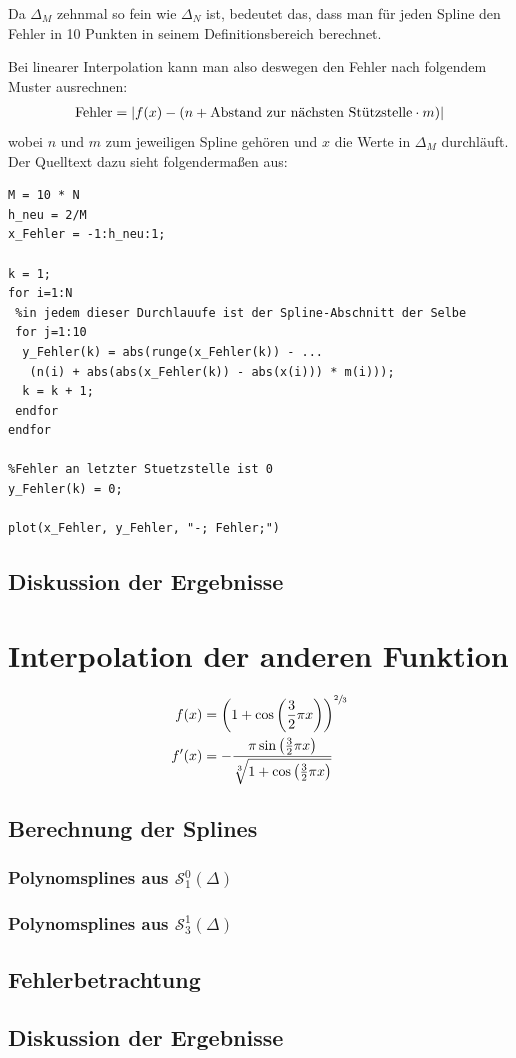 \documentclass[ngerman,a4paper]{texmf/tex/latex/mathscript/mathscript}
\begin{document}
	Da $\Delta_M$ zehnmal so fein wie $\Delta_N$ ist, bedeutet das, dass man für jeden Spline den Fehler in 10 Punkten in seinem Definitionsbereich berechnet.
	
	Bei linearer Interpolation kann man also deswegen den Fehler nach folgendem Muster ausrechnen:
	\begin{align}
		\text{Fehler} = \vert f(x) - (n + \text{Abstand zur nächsten Stützstelle}\cdot m) \vert \notag
	\end{align}
	wobei $n$ und $m$ zum jeweiligen Spline gehören und $x$ die Werte in $\Delta_M$ durchläuft. Der Quelltext dazu sieht folgendermaßen aus:
\begin{lstlisting}
M = 10 * N
h_neu = 2/M
x_Fehler = -1:h_neu:1;

k = 1;
for i=1:N
 %in jedem dieser Durchlauufe ist der Spline-Abschnitt der Selbe
 for j=1:10
  y_Fehler(k) = abs(runge(x_Fehler(k)) - ...
   (n(i) + abs(abs(x_Fehler(k)) - abs(x(i))) * m(i)));
  k = k + 1;
 endfor
endfor

%Fehler an letzter Stuetzstelle ist 0
y_Fehler(k) = 0;

plot(x_Fehler, y_Fehler, "-; Fehler;")
\end{lstlisting}
	
	\subsection{Diskussion der Ergebnisse}


\section{Interpolation der anderen Funktion}
	\begin{align}
		f(x) &= \left( 1+\cos\left(\frac{3}{2}\pi x \right) \right)^{\sfrac{2}{3}}\notag \\
		f'(x) &=-\frac{\pi\sin\left(\frac{3}{2}\pi x\right)}{\sqrt[3]{1+\cos\left(\frac{3}{2}\pi x \right)}}\notag
	\end{align}
	
	\subsection{Berechnung der Splines}
	\subsubsection{Polynomsplines aus $\mathcal{S}_1^0(\Delta)$}
	
	\subsubsection{Polynomsplines aus $\mathcal{S}_3^1(\Delta)$}
	
	\subsection{Fehlerbetrachtung}
	
	\subsection{Diskussion der Ergebnisse}
\end{document}
